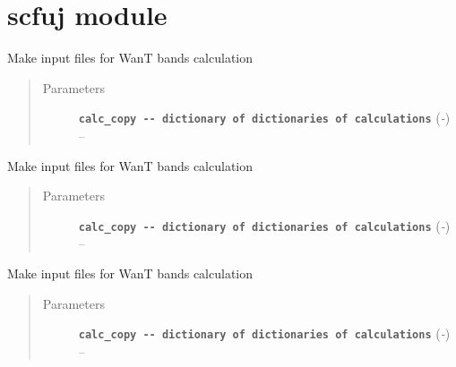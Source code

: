 \documentclass[letterpaper,10pt,english]{sphinxmanual}
\begin{document}
\chapter{scfuj module}
\label{scfuj:module-scfuj}\label{scfuj::doc}\label{scfuj:scfuj-module}

\begin{fulllineitems}
\label{scfuj:scfuj.WanT_bands}
Make input files for  WanT bands calculation
\begin{quote}\begin{description}
\item[{Parameters}] \leavevmode
\textbf{\texttt{calc\_copy -{-} dictionary of dictionaries of calculations}} (\emph{-}) -- 

\end{description}\end{quote}

\end{fulllineitems}


\begin{fulllineitems}
\label{scfuj:scfuj.WanT_dos}
Make input files for  WanT bands calculation
\begin{quote}\begin{description}
\item[{Parameters}] \leavevmode
\textbf{\texttt{calc\_copy -{-} dictionary of dictionaries of calculations}} (\emph{-}) -- 

\end{description}\end{quote}

\end{fulllineitems}


\begin{fulllineitems}
\label{scfuj:scfuj.WanT_epsilon}
Make input files for  WanT bands calculation
\begin{quote}\begin{description}
\item[{Parameters}] \leavevmode
\textbf{\texttt{calc\_copy -{-} dictionary of dictionaries of calculations}} (\emph{-}) -- 

\end{description}\end{quote}

\end{fulllineitems}
\end{document}
